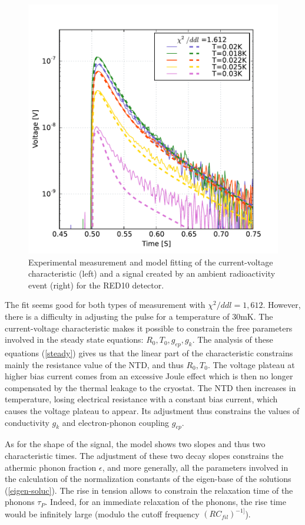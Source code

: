 \begin{figure}[!ht]
\begin{minipage}{0.49\textwidth}
\includegraphics[width=\textwidth]{Figures/Ethem/pulse_red10.pdf}
\end{minipage}
\caption{Experimental measurement and model fitting of the current-voltage characteristic (left) and a signal created by an ambient radioactivity event (right) for the RED10 detector.}
\label{v2i-red10}
\end{figure}

The fit seems good for both types of measurement with $\chi^2/ddl=1,612$. However, there is a difficulty in adjusting the pulse for a temperature of $30$mK. The current-voltage characteristic makes it possible to constrain the free parameters involved in the steady state equations: $R_0, T_0, g_{ep}, g_k$. The analysis of these equations (\ref{steady}) gives us that the linear part of the characteristic constrains mainly the resistance value of the NTD, and thus $R_0, T_0$. The voltage plateau at higher bias current comes from an excessive Joule effect which is then no longer compensated by the thermal leakage to the cryostat. The NTD then increases in temperature, losing electrical resistance with a constant bias current, which causes the voltage plateau to appear. Its adjustment thus constrains the values of conductivity $g_k$ and electron-phonon coupling $g_{ep}$.

As for the shape of the signal, the model shows two slopes and thus two characteristic times. The adjustment of these two decay slopes constrains the athermic phonon fraction $\epsilon$, and more generally, all the parameters involved in the calculation of the normalization constants of the eigen-base of the solutions (\ref{eigen-soluc}).
The rise in tension allows to constrain the relaxation time of the phonons $\tau_P$. Indeed, for an immediate relaxation of the phonons, the rise time would be infinitely large (modulo the cutoff frequency $(RC_{fil})^{-1]}$).

